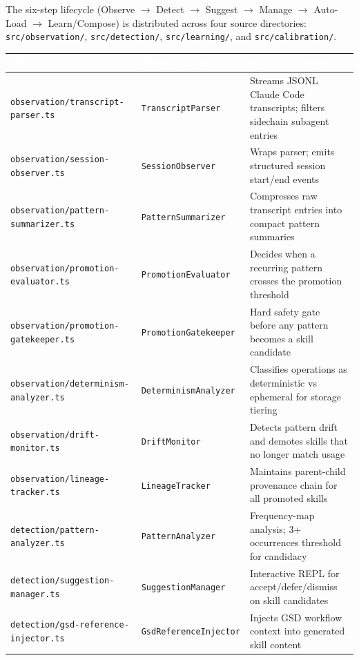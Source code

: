 \documentclass[11pt,letterpaper]{article}
\newcommand{\tableheader}[1]{\textbf{\sffamily\textcolor{white}{#1}}}
\begin{document}
The six-step lifecycle (Observe $\to$ Detect $\to$ Suggest $\to$ Manage $\to$ Auto-Load $\to$ Learn/Compose) is distributed across four source directories: \texttt{src/observation/}, \texttt{src/detection/}, \texttt{src/learning/}, and \texttt{src/calibration/}.

\begin{center}
\begin{tabularx}{\textwidth}{L{4.5cm}L{4cm}X}
\toprule
{}
\tableheader{File} & \tableheader{Class / Export} & \tableheader{Role in Lifecycle} \\
\midrule
\texttt{observation/transcript-parser.ts} & \texttt{TranscriptParser} & Streams JSONL Claude Code transcripts; filters sidechain subagent entries \\
\texttt{observation/session-observer.ts} & \texttt{SessionObserver} & Wraps parser; emits structured session start/end events \\
\texttt{observation/pattern-summarizer.ts} & \texttt{PatternSummarizer} & Compresses raw transcript entries into compact pattern summaries \\
\texttt{observation/promotion-evaluator.ts} & \texttt{PromotionEvaluator} & Decides when a recurring pattern crosses the promotion threshold \\
\texttt{observation/promotion-gatekeeper.ts} & \texttt{PromotionGatekeeper} & Hard safety gate before any pattern becomes a skill candidate \\
\texttt{observation/determinism-analyzer.ts} & \texttt{DeterminismAnalyzer} & Classifies operations as deterministic vs ephemeral for storage tiering \\
\texttt{observation/drift-monitor.ts} & \texttt{DriftMonitor} & Detects pattern drift and demotes skills that no longer match usage \\
\texttt{observation/lineage-tracker.ts} & \texttt{LineageTracker} & Maintains parent-child provenance chain for all promoted skills \\
\texttt{detection/pattern-analyzer.ts} & \texttt{PatternAnalyzer} & Frequency-map analysis; 3+ occurrences threshold for candidacy \\
\texttt{detection/suggestion-manager.ts} & \texttt{SuggestionManager} & Interactive REPL for accept/defer/dismiss on skill candidates \\
\texttt{detection/gsd-reference-injector.ts} & \texttt{GsdReferenceInjector} & Injects GSD workflow context into generated skill content \\

\end{tabularx}
\end{center}
\end{document}
